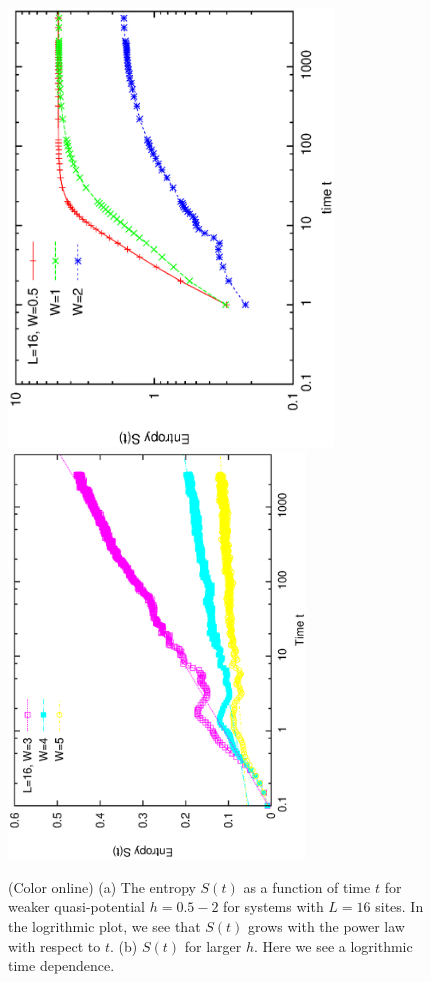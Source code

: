 \documentclass[prl,aps,epsf,showpacs,twocolumn]{revtex4}
\begin{document}

\begin{figure}[b]
  \includegraphics[angle=-90, origin=c,  width=3.4in]{newfig1a.ps}\\
  \vspace{-0.6in}
  \includegraphics[angle=-90,width=3.1in]{newfig1b.ps}\\
  \vspace{0.1in}
  \caption{(Color online) (a) The entropy $S(t)$ as a function of time $t$ for weaker
    quasi-potential $h=0.5-2$ for systems with $L=16$ sites. In the logrithmic plot,
    we see that $S(t)$ grows with the power law with respect to $t$.
    (b) $S(t)$ for larger $h$. Here we see a logrithmic time dependence.
  }
\label{fig1}
\end{figure}
\end{document}
